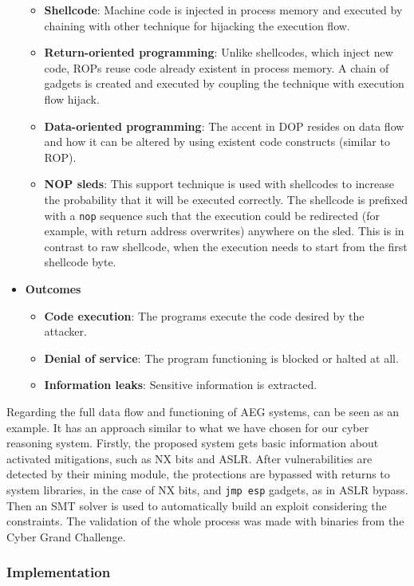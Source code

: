 \documentclass[12pt,a4paper,english,onecolumn]{IEEEtran}
\begin{document}
\begin{itemize}
\begin{itemize}
        \item \textbf{Shellcode}: Machine code is injected in process memory and executed by chaining with other technique for hijacking the execution flow.
        \item \textbf{Return-oriented programming}: Unlike shellcodes, which inject new code, ROPs reuse code already existent in process memory. A chain of gadgets is created and executed by coupling the technique with execution flow hijack.
        \item \textbf{Data-oriented programming}: The accent in DOP resides on data flow and how it can be altered by using existent code constructs (similar to ROP).
        \item \textbf{NOP sleds}: This support technique is used with shellcodes to increase the probability that it will be executed correctly. The shellcode is prefixed with a \texttt{nop} sequence such that the execution could be redirected (for example, with return address overwrites) anywhere on the sled. This is in contrast to raw shellcode, when the execution needs to start from the first shellcode byte.
    \end{itemize}
    \item \textbf{Outcomes} \begin{itemize}
        \item \textbf{Code execution}: The programs execute the code desired by the attacker.
        \item \textbf{Denial of service}: The program functioning is blocked or halted at all.
        \item \textbf{Information leaks}: Sensitive information is extracted.
    \end{itemize}
\end{itemize}

Regarding the full data flow and functioning of AEG systems, \cite{archr} can be seen as an example. It has an approach similar to what we have chosen for our cyber reasoning system. Firstly, the proposed system gets basic information about activated mitigations, such as NX bits and ASLR. After vulnerabilities are detected by their mining module, the protections are bypassed with returns to system libraries, in the case of NX bits, and \texttt{jmp esp} gadgets, as in ASLR bypass. Then an SMT solver is used to automatically build an exploit considering the constraints. The validation of the whole process was made with binaries from the Cyber Grand Challenge.

\subsubsection{Implementation}
\end{document}
